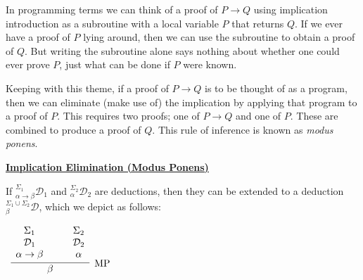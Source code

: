\documentclass{book}
\begin{document}
    In programming terms we can think of a proof of $P \to Q$ using implication introduction as a subroutine with a local variable $P$ that returns $Q$. If we ever have a proof of $P$ lying around, then we can use the subroutine to obtain a proof of $Q$. But writing the subroutine alone says nothing about whether one could ever prove $P$, just what can be done if $P$ were known. 

    Keeping with this theme, if a proof of $P \to Q$ is to be thought of as a program, then we can eliminate (make use of) the implication by applying that program to a proof of $P$. This requires two proofs; one of $P \to Q$ and one of $P$. These are combined to produce a proof of $Q$. This rule of inference is known as \emph{modus ponens}.

    \vspace{0.1cm}
    
    \begin{mdframed}

        \underline{{\bf Implication Elimination (Modus Ponens)}}

        If $^{\Sigma_{1}}_{\alpha \rightarrow \beta}\mathcal{D}_{1}$ and $^{\Sigma_{2}}_{\alpha}\mathcal{D}_{2}$ are deductions, then they can be extended to a deduction $^{\Sigma_{1}\cup \Sigma_{2}}_{\beta}\mathcal{D}$, which we depict as follows: 

        \begin{center}
            $\begin{array}{c}		
                \infer[\MP]{\beta}{\begin{array}{c} \Sigma_{1} \\ \mathcal{D}_{1} \\ \alpha \rightarrow \beta \end{array} \quad & \begin{array}{c} \Sigma_{2} \\ \mathcal{D}_{2} \\ \alpha \end{array}}	
            \end{array}$
        \end{center}
    \end{mdframed}
\end{document}
